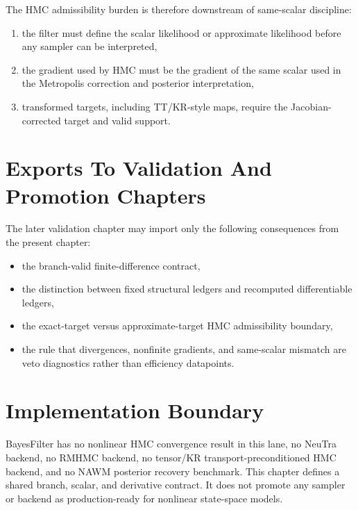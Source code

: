 The HMC admissibility burden is therefore downstream of same-scalar discipline:
\begin{enumerate}[label=(\arabic*), leftmargin=0.28in]
  \item the filter must define the scalar likelihood or approximate likelihood
  before any sampler can be interpreted,
  \item the gradient used by HMC must be the gradient of the same scalar used in
  the Metropolis correction and posterior interpretation,
  \item transformed targets, including TT/KR-style maps, require the
  Jacobian-corrected target and valid support.
\end{enumerate}

\section{Exports To Validation And Promotion Chapters}
\label{sec:bf-hd-fixed-branch-exports}

The later validation chapter may import only the following consequences from the
present chapter:
\begin{itemize}[leftmargin=0.28in]
  \item the branch-valid finite-difference contract,
  \item the distinction between fixed structural ledgers and recomputed
  differentiable ledgers,
  \item the exact-target versus approximate-target HMC admissibility boundary,
  \item the rule that divergences, nonfinite gradients, and same-scalar mismatch
  are veto diagnostics rather than efficiency datapoints.
\end{itemize}

\section{Implementation Boundary}
\label{sec:bf-hd-hmc-boundary}

BayesFilter has no nonlinear HMC convergence result in this lane, no NeuTra
backend, no RMHMC backend, no tensor/KR transport-preconditioned HMC backend,
and no NAWM posterior recovery benchmark.  This chapter defines a shared branch,
scalar, and derivative contract.  It does not promote any sampler or backend as
production-ready for nonlinear state-space models.
